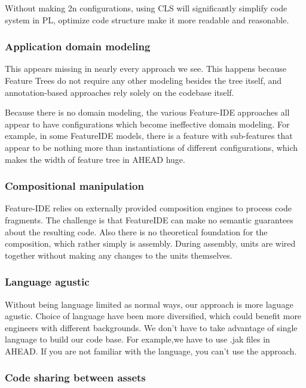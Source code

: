 \documentclass[sigconf]{acmart}
\begin{document}
Without making 2n configurations, using CLS will significantly simplify code system in PL, optimize code structure
make it more readable and reasonable.

\subsubsection{Application domain modeling}

This appears missing in nearly every approach we see. This happens because Feature Trees do not require any
other modeling besides the tree itself, and annotation-based approaches rely solely on the codebase itself.

Because there is no domain modeling, the various Feature-IDE approaches all appear to have configurations
which become ineffective domain modeling. For example, in some FeatureIDE models,
there is a feature with sub-features that appear to be nothing more than instantiations of different
configurations, which makes the width of feature tree in AHEAD huge.

\subsubsection{Compositional manipulation}

Feature-IDE relies on externally provided composition engines to process code fragments. The challenge
is that FeatureIDE can make no semantic guarantees about the resulting code. Also there is no theoretical
foundation for the composition, which rather simply is assembly. During assembly, units are wired together
without making any changes to the units themselves.

\subsubsection{Language agustic}


Without being language limited as normal ways, our approach is more laguage agustic. Choice of language have
been more diversified, which could benefit more engineers with different backgrounds. We don't have to take
advantage of single language to build our code base. For example,we have to use .jak files in AHEAD. If
you are not familiar with the language, you can't use the approach.

\subsubsection{Code sharing between assets}
\end{document}
